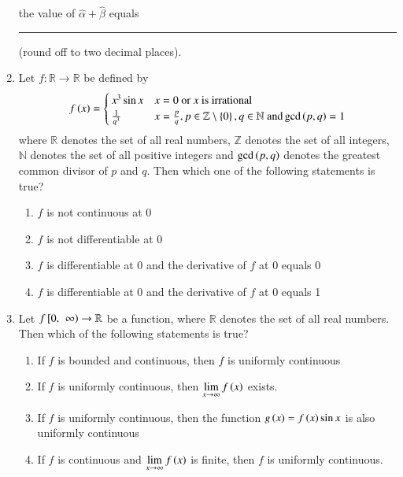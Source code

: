 \documentclass[journal]{IEEEtran}
\begin{document}
\begin{enumerate}
    

    the value of $\hat\alpha + \hat\beta$ equals \rule{1.0cm}{0.15mm}
   (round off to two decimal places).

    \item Let $f: \mathbb{R} \to \mathbb{R}$ be defined by
    \begin{align*}
        f\left(x\right) = 
        \begin{cases}
            x^3\sin x & \text{$x = 0$ or $x$ is irrational} \\
            \frac{1}{q^3} & x = \frac{p}{q}, p \in \mathbb{Z} \setminus \left\{0\right\}, q \in \mathbb{N} \text{ and} \gcd\left(p, q\right) = 1
        \end{cases}
    \end{align*}
    where $\mathbb{R}$ denotes the set of all real numbers, $\mathbb{Z}$ denotes the set of all integers, $\mathbb{N}$ denotes the
    set of all positive integers and $\gcd\left(p, q\right)$ denotes the greatest common divisor of $p$ and $q$. Then which one of the
    following statements is true?

    \begin{enumerate}
        \item $f$ is not continuous at 0
        \item $f$ is not differentiable at 0
        \item $f$ is differentiable at 0 and the derivative of $f$ at 0 equals 0
        \item $f$ is differentiable at 0 and the derivative of $f$ at 0 equals 1
    \end{enumerate}

    \item Let $f {}\left[0, \right.\left.\infty\right) \to \mathbb{R}$ be a function, where $\mathbb{R}$ denotes the set of all real numbers.
    Then which of the following statements is true?

    \begin{enumerate}
        \item If $f$ is bounded and continuous, then $f$ is uniformly continuous
        \item If $f$ is uniformly continuous, then $\lim\limits_{x \to \infty} f\left(x\right)$ exists.
        \item If $f$ is uniformly continuous, then the function $g\left(x\right) = f\left(x\right)\sin x$
        is also uniformly continuous
        \item If $f$ is continuous and $\lim\limits_{x \to \infty} f\left(x\right)$ is finite, then
        $f$ is uniformly continuous.
    \end{enumerate}


\end{enumerate}
\end{document}
